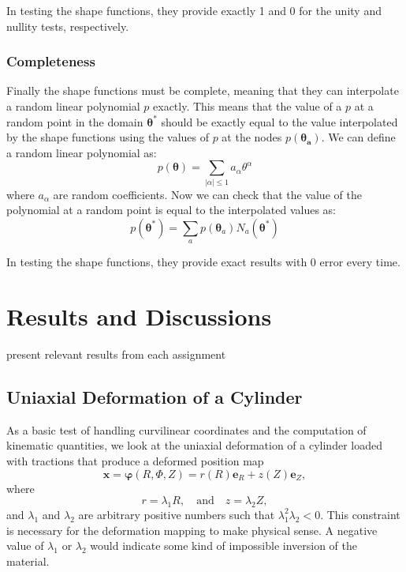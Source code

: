 \documentclass[]{spie}  %
\begin{document}
In testing the shape functions, they provide exactly 1 and 0 for the unity and nullity tests, respectively. 

\subsubsection{Completeness}
Finally the shape functions must be complete, meaning that they can interpolate a random linear polynomial $p$ exactly. This means that the value of a $p$ at a random point in the domain $\bm{\theta^*}$ should be exactly equal to the value interpolated by the shape functions using the values of $p$ at the nodes $p(\bm{\theta_a})$. We can define a random linear polynomial as:
\begin{equation}
p(\bm{\theta}) = \sum\limits_{|\alpha| \leq 1} a_{\alpha}\theta^{\alpha}
\end{equation}
where $a_{\alpha}$ are random coefficients. Now we can check that the value of the polynomial at a random point is equal to the interpolated values as:
\begin{equation}
\label{eq: completeness}
p(\bm{\theta^*}) = \sum\limits_{a} p(\bm{\theta}_a) N_a(\bm{\theta^*})
\end{equation}

In testing the shape functions, they provide exact results with 0 error every time. 

\section{Results and Discussions}
present relevant results from each assignment

\subsection{Uniaxial Deformation of a Cylinder}
As a basic test of handling curvilinear coordinates and the computation of kinematic quantities, we look at the uniaxial deformation of a cylinder loaded with tractions that produce a deformed position map
\[
\bm{x} = \bm{\varphi}(R,\Phi,Z) = r(R) \bm{e}_R + z(Z) \bm{e}_Z ,
\]
where 
\[
r = \lambda_1 R, \quad \text{and} \quad z = \lambda_2 Z,
\]
and $\lambda_1$ and $\lambda_2$ are arbitrary positive numbers such that $\lambda_1^2\lambda_2<0$. This constraint is necessary for the deformation mapping to make physical sense. A negative value of $\lambda_1$ or $\lambda_2$ would indicate some kind of impossible inversion of the material. 
\end{document}
